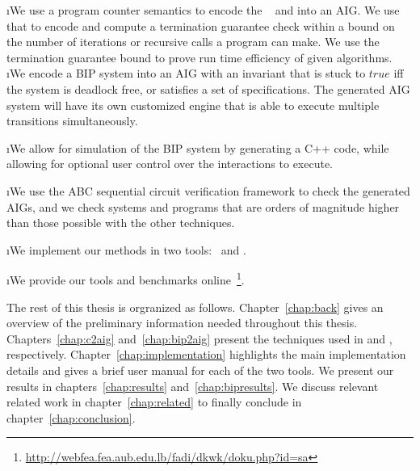 \i We use a program counter semantics to encode the \Pm~ and
\pair{\Pre}{\Post} into an AIG. 
We use that to encode and compute
a termination guarantee check within a bound on the number of
iterations or recursive calls a program can make. 
We use the termination guarantee bound to prove run time efficiency of given
algorithms.
\i We encode a BIP system into an AIG with an invariant that is 
stuck to $\mathit{true}$ iff the system is deadlock free, or satisfies 
a set of specifications. The generated AIG system will have its own 
customized engine that is able to execute multiple transitions simultaneously.

\i We allow for simulation of the BIP system by generating a C++ code, 
while allowing for optional user control over the interactions to execute. 

\i We use the ABC sequential circuit verification framework to check the
generated AIGs, and we check systems and programs that are orders of magnitude
higher than those possible with the other techniques. 

\i We implement our methods in two tools: \mytool~and \biptool. 

\i We provide our tools and benchmarks online~\footnote{\label{fn:online}\url{
http://webfea.fea.aub.edu.lb/fadi/dkwk/doku.php?id=sa}}. 
\ee


The rest of this thesis is orgranized as follows. Chapter~\ref{chap:back} gives an overview
of the preliminary information needed throughout this thesis. Chapters~\ref{chap:c2aig}
and~\ref{chap:bip2aig} present the techniques used in \mytool{} and \biptool{}, respectively. 
Chapter~\ref{chap:implementation} highlights the main implementation details and gives a brief
user manual for each of the two tools. We present our results in chapters~\ref{chap:results}
and~\ref{chap:bipresults}. We discuss relevant related work in chapter~\ref{chap:related}
to finally conclude in chapter~\ref{chap:conclusion}. 





